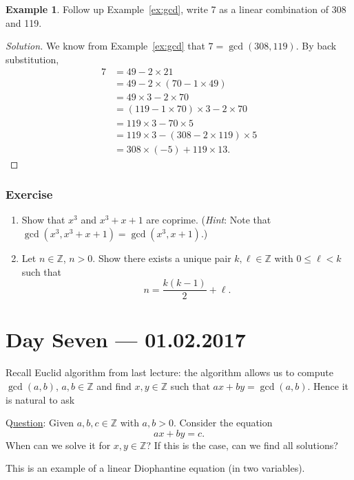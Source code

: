 \documentclass{amsbook}
\theoremstyle{plain}
\theoremstyle{definition}
\newtheorem{example}[theorem]{Example}
\theoremstyle{remark}
\numberwithin{equation}{chapter}
\numberwithin{figure}{chapter}
\newcommand{\Z}{\mathbb{Z}}
\begin{document}
\begin{example}\label{ex:gcd2}
  Follow up Example~\ref{ex:gcd}, write 7 as a linear combination of 308 and 119.
\end{example}
\begin{proof}[Solution]
  We know from Example~\ref{ex:gcd} that $7 = \gcd (308, 119)$. By back substitution,
  \begin{align}
    7 &= 49 - 2 \times 21 \\
      &= 49 - 2 \times (70 - 1 \times 49) \\
      &= 49 \times 3 - 2 \times 70 \\
      &= (119 - 1 \times 70) \times 3 - 2 \times 70 \\
      &= 119 \times 3 - 70 \times 5 \\
      &= 119 \times 3 - (308 - 2 \times 119) \times 5 \\
      &= 308 \times (-5) + 119 \times 13. 
  \end{align}
\end{proof}
\subsection*{Exercise}
\begin{enumerate}
\item Show that $x^3$ and $x^3 + x + 1$ are coprime. (\emph{Hint}: Note that $\gcd (x^3, x^3 + x + 1) = \gcd (x^3, x + 1)$.)
\item Let $n \in \Z$, $n > 0$. Show there exists a unique pair $k, \ell \in \Z$ with $0 \leqslant \ell < k$ such that
  \[
    n = \frac{k(k - 1)}2 + \ell.
  \]
  
\end{enumerate}
\chapter[Lecture Seven]{Day Seven \hfill {\footnotesize \rm --- 01.02.2017}}\label{chp:diophantine_two_var}

Recall Euclid algorithm from last lecture: the algorithm allows us to compute $\gcd(a, b)$, $a, b \in \mathbb{Z}$ and find $x, y \in \mathbb{Z}$ such that $ax + by = \gcd (a, b)$. Hence it is natural to ask

Q\underline{uestion}: Given $a, b, c \in \mathbb{Z}$ with $a, b > 0$. Consider the equation
\[
  ax + by = c.
\]
When can we solve it for $x, y \in \mathbb{Z}$? If this is the case, can we find all solutions?

This is an example of a linear Diophantine equation (in two variables).
\end{document}
